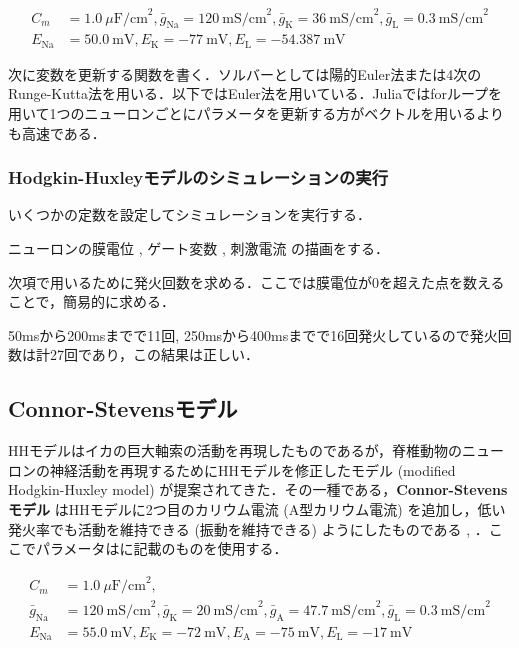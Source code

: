 \begin{align}
C_m&=1.0\ \mu\textrm{F/cm}^2, \bar{g}_{\text{Na}}=120\ \textrm{mS/cm}^2, \bar{g}_{\text{K}}=36\ \textrm{mS/cm}^2, \bar{g}_{\text{L}}=0.3\ \textrm{mS/cm}^2\\
E_{\text{Na}}&=50.0\ \textrm{mV}, E_{\text{K}}=-77\ \textrm{mV}, E_{\text{L}}=-54.387\ \textrm{mV} 
\end{align}



次に変数を更新する関数を書く．ソルバーとしては陽的Euler法または4次のRunge-Kutta法を用いる．以下ではEuler法を用いている．Juliaではforループを用いて1つのニューロンごとにパラメータを更新する方がベクトルを用いるよりも高速である．
\subsubsection{Hodgkin-Huxleyモデルのシミュレーションの実行}
いくつかの定数を設定してシミュレーションを実行する．

ニューロンの膜電位 , ゲート変数 , 刺激電流 の描画をする．


次項で用いるために発火回数を求める．ここでは膜電位が0を超えた点を数えることで，簡易的に求める．

50msから200msまでで11回, 250msから400msまでで16回発火しているので発火回数は計27回であり，この結果は正しい．
\subsection{Connor-Stevensモデル}
HHモデルはイカの巨大軸索の活動を再現したものであるが，脊椎動物のニューロンの神経活動を再現するためにHHモデルを修正したモデル (modified Hodgkin-Huxley model) が提案されてきた．その一種である，\textbf{Connor-Stevensモデル} はHHモデルに2つ目のカリウム電流 (A型カリウム電流) を追加し，低い発火率でも活動を維持できる (振動を維持できる) ようにしたものである \citep{Connor1977-qo}, \citep{Connor1971-rs}．ここでパラメータは\citep{Dayan2005-ib}に記載のものを使用する．


\begin{align}
C_m&=1.0\ \mu\textrm{F/cm}^2,\\ 
\bar{g}_{\text{Na}}&=120\ \textrm{mS/cm}^2, \bar{g}_{\text{K}}=20\ \textrm{mS/cm}^2, \bar{g}_{\text{A}}=47.7\ \textrm{mS/cm}^2, \bar{g}_{\text{L}}=0.3\ \textrm{mS/cm}^2\\
E_{\text{Na}}&=55.0\ \textrm{mV}, E_{\text{K}}=-72\ \textrm{mV}, E_{\text{A}}=-75\ \textrm{mV},E_{\text{L}}=-17\ \textrm{mV} 
\end{align}



